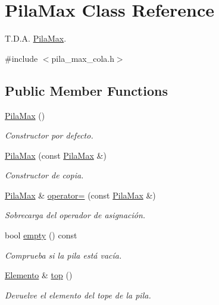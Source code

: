 \hypertarget{classPilaMax}{}\section{Pila\+Max Class Reference}
\label{classPilaMax}


T.\+D.\+A. \hyperlink{classPilaMax}{Pila\+Max}.  




{\ttfamily \#include $<$pila\+\_\+max\+\_\+cola.\+h$>$}

\subsection*{Public Member Functions}
\begin{DoxyCompactItemize}
\item 
\mbox{\label{classPilaMax_a6e5226f0653735e4b9d3225e7fb334c4}} 
\hyperlink{classPilaMax_a6e5226f0653735e4b9d3225e7fb334c4}{Pila\+Max} ()
\begin{DoxyCompactList}\small\item\em Constructor por defecto. \end{DoxyCompactList}\item 
\hyperlink{classPilaMax_af092e43441ce9df4066c5157f73b8e7a}{Pila\+Max} (const \hyperlink{classPilaMax}{Pila\+Max} \&)
\begin{DoxyCompactList}\small\item\em Constructor de copia. \end{DoxyCompactList}\item 
\hyperlink{classPilaMax}{Pila\+Max} \& \hyperlink{classPilaMax_a915926c0eff1f0e297895518a05405d7}{operator=} (const \hyperlink{classPilaMax}{Pila\+Max} \&)
\begin{DoxyCompactList}\small\item\em Sobrecarga del operador de asignación. \end{DoxyCompactList}\item 
bool \hyperlink{classPilaMax_ab31ac009a1c761470cf3cac634396694}{empty} () const
\begin{DoxyCompactList}\small\item\em Comprueba si la pila está vacía. \end{DoxyCompactList}\item 
\hyperlink{structElemento}{Elemento} \& \hyperlink{classPilaMax_a6ddf2f4ad4699aabf25434fdb84fcd75}{top} ()
\begin{DoxyCompactList}\small\item\em Devuelve el elemento del tope de la pila. \end{DoxyCompactList}\item 

\end{DoxyCompactItemize}
